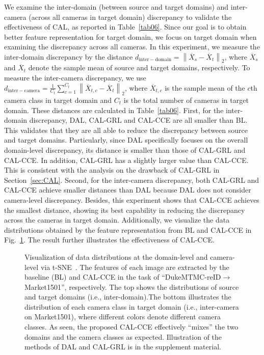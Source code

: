 \documentclass[10pt,twocolumn,letterpaper]{article}
\begin{document}
 
We examine the inter-domain (between source and target domains) and inter-camera (across all cameras in target domain) discrepancy to validate the effectiveness of CAL, as reported in Table~\ref{tab06}. Since our goal is to obtain better feature representation for target domain, we focus on target domain when examining the discrepancy across all cameras. In this experiment, we measure the inter-domain discrepancy by the distance $d_{\mathrm{inter-domain}}=\left \| \overline{X}_{s}-\overline{X}_{t} \right \|_{2}$, where $\overline{X}_{s}$ and $\overline{X}_{t}$ denote the sample mean of source and target domains, respectively. To measure the inter-camera discrepancy, we use $d_{\mathrm{inter-camera}}=\frac{1}{C_{t}}\sum_{c=1}^{C_{t}}\left \| \overline{X}_{t,c}-\overline{X}_{t} \right \|_{2}$, where $\overline{X}_{t,c}$ is the sample mean of the $c$th camera class in target domain and $C_{t}$ is the total number of cameras in target domain. These distances are calculated in Table~\ref{tab06}. First, for the inter-domain discrepancy, DAL, CAL-GRL and CAL-CCE are all smaller than BL. This validates that they are all able to reduce the discrepancy between source and target domains. Particularly, since DAL specifically focuses on the overall domain-level discrepancy, its distance is smaller than those of CAL-GRL and CAL-CCE. In addition, CAL-GRL has a slightly larger value than CAL-CCE. This is consistent with the analysis on the drawback of CAL-GRL in Section~\ref{sec:CAL}. Second, for the inter-camera discrepancy, both CAL-GRL and CAL-CCE achieve smaller distances than DAL because DAL does not consider camera-level discrepancy. Besides, this experiment shows that CAL-CCE achieves the smallest distance, showing its best capability in reducing the discrepancy across the cameras in target domain. Additionally, we visualize the data distributions obtained by the feature representation from BL and CAL-CCE in Fig.~\ref{fig9}. The result further illustrates the effectiveness of CAL-CCE. 


 
\begin{figure}\centering
{}
\caption{Visualization of data distributions at the domain-level and camera-level via t-SNE~\cite{maaten2008visualizing}. The features of each image are extracted by the baseline (BL) and CAL-CCE in the task of ``DukeMTMC-reID$\rightarrow$Market1501'', respectively. The top shows the distributions of source and target domains (i.e., inter-domain).The bottom illustrates the distribution of each camera class in target domain (i.e., inter-camera on Market1501), where different colors denote different camera classes. As seen, the proposed CAL-CCE effectively ``mixes'' the two domains and the camera classes as expected. Illustration of the methods of DAL and CAL-GRL is in the supplement material.}
\label{fig9}
\vspace*{-15pt}\end{figure}
 
\end{document}
